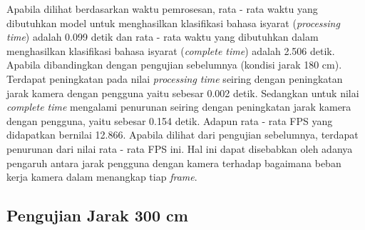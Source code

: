 Apabila dilihat berdasarkan waktu pemrosesan, rata - rata waktu yang dibutuhkan model untuk menghasilkan klasifikasi bahasa isyarat (\emph{processing time}) adalah 0.099 detik dan rata - rata waktu yang dibutuhkan dalam menghasilkan klasifikasi bahasa isyarat (\emph{complete time}) adalah 2.506 detik. Apabila dibandingkan dengan pengujian sebelumnya (kondisi jarak 180 cm). Terdapat peningkatan pada nilai \emph{processing time} seiring dengan peningkatan jarak kamera dengan pengguna yaitu sebesar 0.002 detik. Sedangkan untuk nilai \emph{complete time} mengalami penurunan seiring dengan peningkatan jarak kamera dengan pengguna, yaitu sebesar 0.154 detik. Adapun rata - rata FPS yang didapatkan bernilai 12.866. Apabila dilihat dari pengujian sebelumnya, terdapat penurunan dari nilai rata - rata FPS ini. Hal ini dapat disebabkan oleh adanya pengaruh antara jarak pengguna dengan kamera terhadap bagaimana beban kerja kamera dalam menangkap tiap \emph{frame}.

\subsection{Pengujian Jarak 300 cm}
\label{sec:analisisjarak3}

